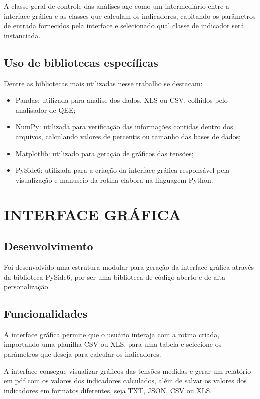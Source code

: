 A classe geral de controle das análises age como um intermediário entre a interface gráfica e as classes que calculam os indicadores, capitando os parâmetros de entrada fornecidos pela interface e selecionado qual classe de indicador será instanciada.

\subsection{Uso de bibliotecas específicas}

Dentre as bibliotecas mais utilizadas nesse trabalho se destacam:

\begin{itemize}
  \item Pandas: utilizada para análise dos dados, XLS ou CSV, colhidos pelo analisador de QEE;
  \item NumPy: utilizada para verificação das informações contidas dentro dos arquivos, calculando valores de percentis ou tamanho das bases de dados;
  \item Matplotlib: utilizado para geração de gráficos das tensões;
  \item PySide6: utilizada para a criação da interface gráfica responsável pela visualização e manuseio da rotina elabora na linguagem Python.
\end{itemize}

\section{INTERFACE GRÁFICA}

\subsection{Desenvolvimento}

Foi desenvolvido uma estrutura modular para geração da interface gráfica através da biblioteca PySide6, por ser uma biblioteca de código aberto e de alta personalização.

\subsection{Funcionalidades}

A interface gráfica permite que o usuário interaja com a rotina criada, importando uma planilha CSV ou XLS, para uma tabela e selecione os parâmetros que deseja para calcular os indicadores.

A interface consegue visualizar gráficos das tensões medidas e gerar um relatório em pdf com os valores dos indicadores calculados, além de salvar os valores dos indicadores em formatos diferentes, seja TXT, JSON, CSV ou XLS.

